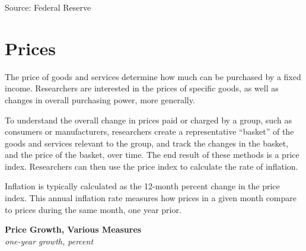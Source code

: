 \documentclass{report}
\begin{document}
{\begin{minipage}{0.76\textwidth}
{ \setlength{\tabcolsep}{3.1pt} \color{black!90}
{\renewcommand{\arraystretch}{1.54}
	\begin{tabular}{p{40mm} R{13.0mm} R{13.0mm} R{13.0mm} R{13.0mm} R{13.0mm}}
		 \hline
	\end{tabular}
}}
		
\vspace{-2mm}
\footnotesize{Source: Federal Reserve}
\end{minipage}
\newpage 
\hypertarget{pr}{\label{pr}}  
\begin{minipage}{0.76\textwidth} 
\section*{Prices}
\vspace*{-2mm}

\small The price of goods and services determine how much can be purchased by a fixed income. Researchers are interested in the prices of specific goods, as well as changes in overall purchasing power, more generally.

To understand the overall change in prices paid or charged by a group, such as consumers or manufacturers, researchers create a representative ``basket'' of the goods and services relevant to the group, and track the changes in the basket, and the price of the basket, over time. The end result of these methods is a price index. Researchers can then use the price index to calculate the rate of inflation.

Inflation is typically calculated as the 12-month percent change in the price index. This annual inflation rate measures how prices in a given month compare to prices during the same month, one year prior. 
\vspace{1mm}

\normalsize \textbf{Price Growth, Various Measures}\\
\footnotesize{\textit{one-year growth, percent}}
\vspace*{-4mm}

\hspace*{-2mm}  \setlength{\tabcolsep}{3.1pt} \color{black!90}
	{\renewcommand{\arraystretch}{1.5}
		\begin{tabular}{p{30mm} R{7.6mm} R{7.6mm} R{7.6mm} R{7.6mm} R{7.6mm} R{7.6mm} 
		   R{9.2mm} R{8.5mm}}
			  \hline
		\end{tabular}}\vspace{-1mm}
		

\end{minipage}}
\end{document}
